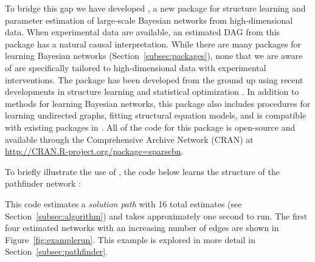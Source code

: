 \documentclass[article]{jss}
\renewcommand{\|}{\,|\,}
\begin{document}
To bridge this gap we have developed , a new  \citep{rcore2016} package for structure learning and parameter estimation of large-scale Bayesian networks from high-dimensional data. When experimental data are available, an estimated DAG from this package has a natural causal interpretation. While there are many  packages for learning Bayesian networks (Section~\ref{subsec:packages}), none that we are aware of are specifically tailored to high-dimensional data with experimental interventions. The  package has been developed from the ground up using recent developments in structure learning \citep{fu2013,aragam2015,gu2018} and statistical optimization \citep{friedman2007,friedman2010,mazumder2011}. In addition to methods for learning Bayesian networks, this package also includes procedures for learning undirected graphs, fitting structural equation models, and is compatible with existing packages in . All of the code for this package is open-source and available through the Comprehensive  Archive Network (CRAN) at \url{http://CRAN.R-project.org/package=sparsebn}.

To briefly illustrate the use of , the code below learns the structure of the pathfinder network \citep{heckerman1992}:
%
\begin{CodeChunk}
\end{CodeChunk}
%
This code estimates a \emph{solution path} with 16 total estimates (see Section~\ref{subsec:algorithm}) and takes approximately one second to run. The first four estimated networks with an increasing number of edges are shown in Figure~\ref{fig:examplerun}. This example is explored in more detail in Section~\ref{subsec:pathfinder}.
\end{document}
